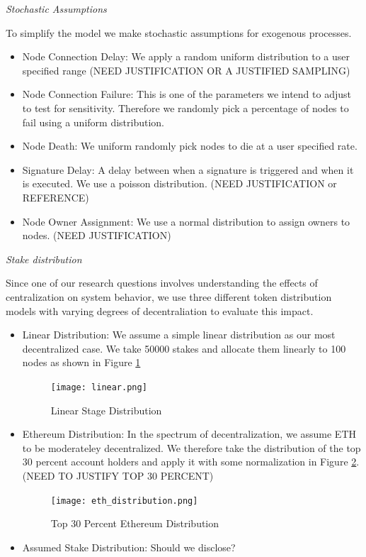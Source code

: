 \documentclass[conference]{IEEEtran}
\begin{document}
\textit{Stochastic Assumptions}

To simplify the model we make stochastic assumptions for exogenous processes.

\begin{itemize}

\item Node Connection Delay: We apply a random uniform distribution to a user specified range (NEED JUSTIFICATION OR A JUSTIFIED SAMPLING)
\item Node Connection Failure: This is one of the parameters we intend to adjust to test for sensitivity. Therefore we
randomly pick a percentage of nodes to fail using a uniform distribution.
\item Node Death: We uniform randomly pick nodes to die at a user specified rate.
\item Signature Delay: A delay between when a signature is triggered and when it is executed. We use a poisson distribution. (NEED JUSTIFICATION or REFERENCE)
\item Node Owner Assignment: We use a normal distribution to assign owners to nodes. (NEED JUSTIFICATION)
\end{itemize}

\textit{Stake distribution} 

Since one of our research questions involves understanding the effects of centralization
on system behavior, we use three different token distribution models with 
varying degrees of decentraliation to evaluate this impact. 

\begin{itemize}
\item Linear Distribution: We assume a simple linear distribution as our most 
decentralized case. We take 50000 stakes and allocate them linearly to 100 nodes
as shown in Figure \ref{fig:linear_distribution}

\begin{figure}
    \texttt{[image: linear.png]}
    \caption{Linear Stage Distribution}
    \label{fig:linear_distribution}
\end{figure}

\item Ethereum Distribution: In the spectrum of decentralization, we assume 
ETH to be moderateley decentralized. We therefore take the distribution of the 
top 30 percent account holders and apply it with some normalization in Figure \ref{fig:eth_distribution}.
(NEED TO JUSTIFY TOP 30 PERCENT)

\begin{figure}
    \texttt{[image: eth\_distribution.png]}
    \caption{Top 30 Percent Ethereum Distribution}
    \label{fig:eth_distribution}
\end{figure}

\item Assumed Stake Distribution: Should we disclose?
\end{itemize}
\end{document}
